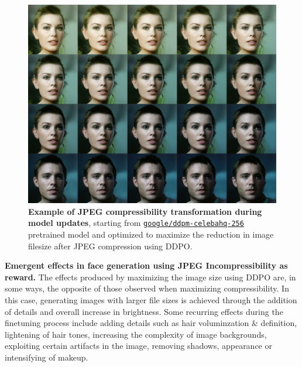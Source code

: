 \begin{figure}[ht]
  \centering
  \includegraphics[scale=1.40]{img/results/compressibility_6.png}
  \vspace{-0pt}  %
    \captionsetup{width=\textwidth} %
    \caption{\textbf{Example of JPEG compressibility transformation during model updates}, starting from \href{https://huggingface.co/google/ddpm-celebahq-256}{\texttt{\texttt{google/ddpm-celebahq-256}}}
    pretrained model and optimized to maximize the reduction in image filesize after JPEG compression using DDPO.}
    \label{fig:ddpm-to-ddpo-compressibility}
\end{figure}

\noindent \textbf{Emergent effects in face generation using JPEG Incompressibility as reward.} The effects produced by maximizing the image size using DDPO are, in some ways, the opposite of those observed when maximizing compressibility. In this case, generating images with larger file sizes is achieved through the addition of details and overall increase in brightness.
Some recurring effects during the finetuning process include adding details such
as hair voluminzation \& definition, lightening of hair tones, increasing the complexity of image backgrounds, exploiting certain artifacts in the image, removing shadows, appearance or intensifying of makeup. \\

